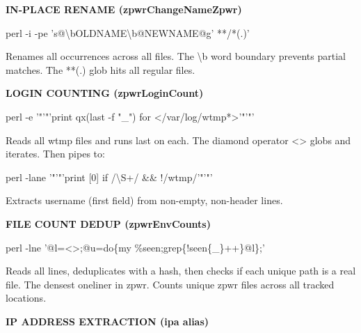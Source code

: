 \documentclass[11pt,a4paper,twoside]{book}
\begin{document}
\vspace{12pt}
{\bfseries\color{neonyellow} IN-PLACE RENAME (zpwrChangeNameZpwr)}\vspace{4pt}

\begin{codebox}
\color{neongreen}perl -i -pe 's@\textbackslash{}bOLDNAME\textbackslash{}b@NEWNAME@g' **/*(.)'\\
\end{codebox}

Renames all occurrences across all files. The \textbackslash{}b word boundary prevents partial matches. The **(.) glob hits all regular files.


\vspace{12pt}
{\bfseries\color{neonyellow} LOGIN COUNTING (zpwrLoginCount)}\vspace{4pt}

\begin{codebox}
\color{neongreen}perl -e '"'"'print qx(last -f "\_") for </var/log/wtmp*>'"'"'\\
\end{codebox}

Reads all wtmp files and runs last on each. The diamond operator <> globs and iterates. Then pipes to:

\begin{codebox}
\color{neongreen}perl -lane '"'"'print [0] if /\textbackslash{}S+/ \&\& !/wtmp/'"'"'\\
\end{codebox}

Extracts username (first field) from non-empty, non-header lines.


\vspace{12pt}
{\bfseries\color{neonyellow} FILE COUNT DEDUP (zpwrEnvCounts)}\vspace{4pt}

\begin{codebox}
\color{neongreen}perl -lne '@l=<>;@u=do\{my \%seen;grep\{!seen\{\_\}++\}@l\};'\\
\end{codebox}

Reads all lines, deduplicates with a hash, then checks if each unique path is a real file. The densest oneliner in zpwr. Counts unique zpwr files across all tracked locations.


\vspace{12pt}
{\bfseries\color{neonyellow} IP ADDRESS EXTRACTION (ipa alias)}\vspace{4pt}
\end{document}
